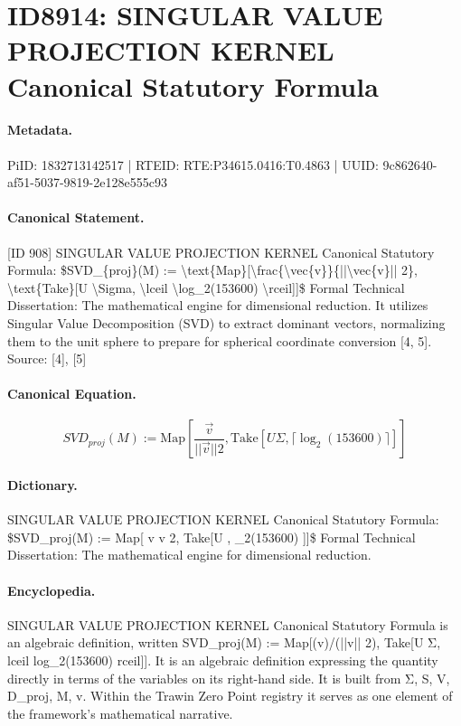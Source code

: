 \section*{ID8914: SINGULAR VALUE PROJECTION KERNEL Canonical Statutory Formula}
\paragraph{Metadata.}
PiID: 1832713142517 | RTEID: RTE:P34615.0416:T0.4863 | UUID: 9c862640-af51-5037-9819-2e128e555c93

\paragraph{Canonical Statement.}
[ID 908] SINGULAR VALUE PROJECTION KERNEL Canonical Statutory Formula: \$SVD\_\{proj\}(M) := \textbackslash{}text\{Map\}[\textbackslash{}frac\{\textbackslash{}vec\{v\}\}\{||\textbackslash{}vec\{v\}|| 2\}, \textbackslash{}text\{Take\}[U \textbackslash{}Sigma, \textbackslash{}lceil \textbackslash{}log\_2(153600) \textbackslash{}rceil]]\$ Formal Technical Dissertation: The mathematical engine for dimensional reduction. It utilizes Singular Value Decomposition (SVD) to extract dominant vectors, normalizing them to the unit sphere to prepare for spherical coordinate conversion [4, 5]. Source: [4], [5]

\paragraph{Canonical Equation.}
\[
SVD_{proj}(M) := \text{Map}[\frac{\vec{v}}{||\vec{v}|| 2}, \text{Take}[U \Sigma, \lceil \log_2(153600) \rceil]]
\]

\paragraph{Dictionary.}
SINGULAR VALUE PROJECTION KERNEL Canonical Statutory Formula: \$SVD\_proj(M) := Map[ v v 2, Take[U , \_2(153600) ]]\$ Formal Technical Dissertation: The mathematical engine for dimensional reduction.

\paragraph{Encyclopedia.}
SINGULAR VALUE PROJECTION KERNEL Canonical Statutory Formula is an algebraic definition, written SVD\_proj(M) := Map[(v)/(||v|| 2), Take[U Σ, lceil log\_2(153600) rceil]]. It is an algebraic definition expressing the quantity directly in terms of the variables on its right-hand side. It is built from Σ, S, V, D\_proj, M, v. Within the Trawin Zero Point registry it serves as one element of the framework's mathematical narrative.
